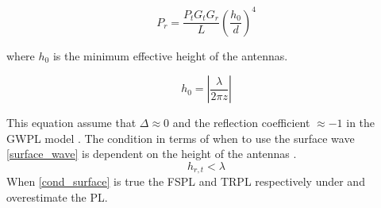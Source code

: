 \begin{equation}
P_r=\frac{P_t G_t G_r }{L}\left(\frac{h_0}{d}\right)^4
\label{surface_wave}
\end{equation}

where $h_0$ is the minimum effective height of the antennas. 

\begin{equation}
h_{0} = \left|\frac{\lambda}{2\pi z}\right|
\label{h_0}
\end{equation}

This equation assume that $\Delta \approx 0$ and the reflection coefficient $\approx -1$ in the GWPL model \cite{Chong}. The condition in terms of when to use the surface wave \eqref{surface_wave} is dependent on the height of the antennas \cite{Chong}.
\begin{equation}
h_{r,t} < \lambda
\label{cond_surface}
\end{equation}
When \eqref{cond_surface} is true the FSPL and TRPL respectively under and overestimate the PL.
